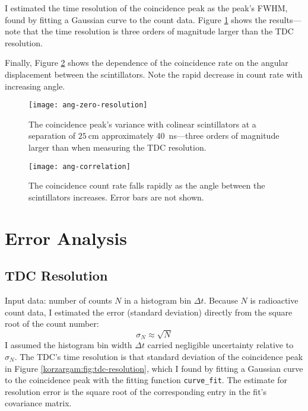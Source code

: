 \documentclass[11pt, a4paper]{article}
\begin{document}
I estimated the time resolution of the coincidence peak as the peak's FWHM, found by fitting a Gaussian curve to the count data. Figure \ref{korzargam:fig:ang-zero-resolutionn} shows the results---note that the time resolution is three orders of magnitude larger than the TDC resolution.

Finally, Figure \ref{korzargam:fig:ang-correlation} shows the dependence of the coincidence rate on the angular displacement between the scintillators. Note the rapid decrease in count rate with increasing angle. 

\begin{figure}[htb!]
\centering
\texttt{[image: ang-zero-resolution]}
\caption{The coincidence peak's variance with colinear scintillators at a separation of $ \SI{25}{\centi \meter} $ approximately \SI{40}{\nano \second}---three orders of magnitude larger than when measuring the TDC resolution.}
\label{korzargam:fig:ang-zero-resolutionn}
\end{figure}


\begin{figure}[htb!]
\centering
\texttt{[image: ang-correlation]}
\caption{The coincidence count rate falls rapidly as the angle between the scintillators increases. Error bars are not shown.}
\label{korzargam:fig:ang-correlation}
\end{figure}


\section{Error Analysis}

\subsection{TDC Resolution} \label{korzargam:ss:tdc-res-error}
Input data: number of counts $ N $ in a histogram bin $ \Delta t $. Because $ N $ is radioactive count data, I estimated the error (standard deviation) directly from the square root of the count number:
\begin{equation*}
	\sigma_{N} \approx \sqrt{N}
\end{equation*}
I assumed the histogram bin width $ \Delta t $ carried negligible uncertainty relative to $ \sigma_{N} $. The TDC's time resolution is that standard deviation of the coincidence peak in Figure \ref{korzargam:fig:tdc-resolution}, which I found by fitting a Gaussian curve to the coincidence peak with the fitting function \texttt{curve\_fit}. The estimate for resolution error is the square root of the corresponding entry in the fit's covariance matrix. 
\end{document}

